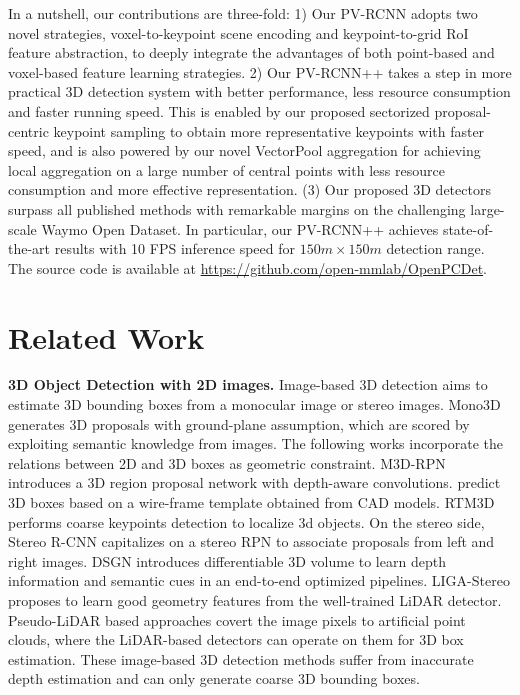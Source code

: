 \documentclass[natbib,twocolumn]{svjour3}          \smartqed  \usepackage{graphicx}
\begin{document}
In a nutshell, our contributions are three-fold:
1) Our PV-RCNN adopts two novel strategies, voxel-to-keypoint scene encoding and keypoint-to-grid RoI feature abstraction, to deeply integrate the advantages of both point-based and voxel-based feature learning strategies. 
2) Our PV-RCNN++ takes a step in more practical 3D detection system with better performance, less resource consumption and faster running speed. This is enabled by our proposed sectorized proposal-centric keypoint sampling to obtain more representative keypoints with faster speed, and is also powered by our novel VectorPool aggregation for achieving local aggregation on a large number of central points with less resource consumption and more effective representation. 
(3) Our proposed 3D detectors surpass all published methods with remarkable margins on the challenging large-scale Waymo Open Dataset.
In particular, our PV-RCNN++ achieves state-of-the-art results with 10 FPS inference speed for $150m \times 150m$ detection range.
The source code is available at \url{https://github.com/open-mmlab/OpenPCDet}. 



\section{Related Work}
\noindent
\textbf{3D Object Detection with 2D images.} Image-based 3D detection aims to estimate 3D bounding boxes from a monocular image or stereo images.
Mono3D \citep{chen2016monocular} generates 3D proposals with ground-plane assumption, which are scored by exploiting semantic knowledge from images. 
The following works \citep{mousavian20173d,li2019gs3d} incorporate the relations between 2D and 3D boxes as geometric constraint. M3D-RPN \citep{brazil2019m3d} introduces a 3D region proposal network with depth-aware convolutions. \citep{chabot2017deep,murthy2017reconstructing,manhardt2019roi} predict 3D boxes based on a wire-frame template obtained from CAD models. 
RTM3D \citep{li2020rtm3d} 
performs coarse keypoints detection to localize 3d objects.
On the stereo side, Stereo R-CNN \citep{li2019stereo,qian2020end} capitalizes on a stereo RPN to associate proposals from left and right images. 
DSGN \citep{chen2020dsgn} introduces differentiable 3D volume to learn depth information and semantic cues in an end-to-end optimized pipelines. 
LIGA-Stereo \citep{guo2021liga} proposes to learn good geometry features from the well-trained LiDAR detector. 
Pseudo-LiDAR based approaches \citep{wang2019pseudo,qian2020end,you2020pseudo} covert the image pixels to artificial point clouds, where the LiDAR-based detectors can operate on them for 3D box estimation. 
These image-based 3D detection methods suffer from inaccurate depth estimation and can only generate coarse 3D bounding boxes. 
\end{document}
